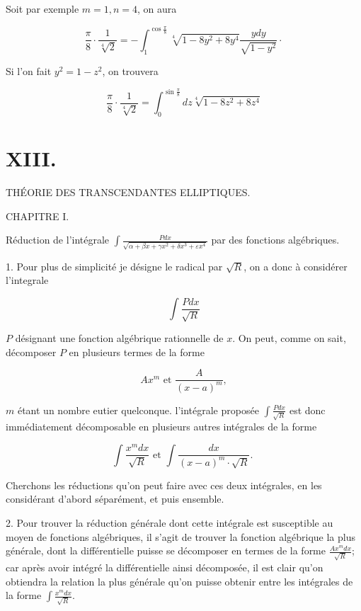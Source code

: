 \documentclass{article}
\begin{document}
Soit par exemple \(m=1, n=4\), on aura

\[
\frac{\pi}{8} \cdot \frac{1}{\sqrt[4]{2}}=-\int_{1}^{\cos \frac{\pi}{8}} \sqrt[4]{1-8 y^{2}+8 y^{4}} \frac{y d y}{\sqrt{1-y^{2}}} \cdot
\]

Si l'on fait \(y^{2}=1-z^{2}\), on trouvera

\[
\frac{\pi}{8} \cdot \frac{1}{\sqrt[4]{2}}=\int_{0}^{\sin \frac{\pi}{8}} d z \sqrt[4]{1-8 z^{2}+8 z^{4}}
\]

\section*{XIII.}

THÉORIE DES TRANSCENDANTES ELLIPTIQUES.

CHAPITRE I.

Réduction de l'intégrale \(\int \frac{P d x}{\sqrt{\alpha+\beta x+\gamma x^{2}+\delta x^{3}+\varepsilon x^{4}}}\) par des fonctions algébriques.

1. Pour plus de simplicité je désigne le radical par \(\sqrt{R}\), on a donc à considérer l'integrale

\[
\int \frac{P d x}{\sqrt{R}}
\]

\(P\) désignant une fonction algébrique rationnelle de \(x\). On peut, comme on sait, décomposer \(P\) en plusieurs termes de la forme

\[
A x^{m} \text { et } \frac{A}{(x-a)^{m}},
\]

\(m\) étant un nombre eutier quelconque. l'intégrale proposée \(\int \frac{P d x}{\sqrt{R}}\) est donc immédiatement décomposable en plusieurs autres intégrales de la forme

\[
\int \frac{x^{m} d x}{\sqrt{R}} \text { et } \int \frac{d x}{(x-a)^{m} \cdot \sqrt{R}} \text {. }
\]

Cherchons les réductions qu'on peut faire avec ces deux intégrales, en les considérant d'abord séparément, et puis ensemble.


2. Pour trouver la réduction générale dont cette intégrale est susceptible au moyen de fonctions algébriques, il s'agit de trouver la fonction algébrique la plus générale, dont la différentielle puisse se décomposer en termes de la forme \(\frac{A x^{m} d x}{\sqrt{R}}\); car après avoir intégré la différentielle ainsi décomposée, il est clair qu'on obtiendra la relation la plus générale qu'on puisse obtenir entre les intégrales de la forme \(\int \frac{x^{m} d x}{\sqrt{R}}\).
\end{document}
